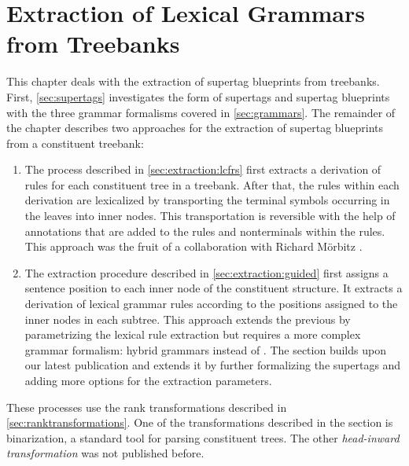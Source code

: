 \documentclass[../document.tex]{subfiles}
\begin{document}
    \chapter{Extraction of Lexical Grammars from Treebanks}\label{sec:extraction}
    This chapter deals with the extraction of supertag blueprints from treebanks.
    First, \cref{sec:supertags} investigates the form of supertags and supertag blueprints with the three grammar formalisms covered in \cref{sec:grammars}.
    The remainder of the chapter describes two approaches for the extraction of supertag blueprints from a constituent treebank:
    \begin{enumerate}
        \item
            The process described in \cref{sec:extraction:lcfrs} first extracts a derivation of  rules for each constituent tree in a treebank.
            After that, the rules within each derivation are lexicalized by transporting the terminal symbols occurring in the leaves into inner nodes.
            This transportation is reversible with the help of annotations that are added to the rules and nonterminals within the rules.
            This approach was the fruit of a collaboration with Richard Mörbitz \citep{MoeRup20,RupMoe21}.
        \item
            The extraction procedure described in \cref{sec:extraction:guided} first assigns a sentence position to each inner node of the constituent structure.
            It extracts a derivation of lexical grammar rules according to the positions assigned to the inner nodes in each subtree.
            This approach extends the previous by parametrizing the lexical rule extraction but requires a more complex grammar formalism: hybrid grammars instead of .
            The section builds upon our latest publication \citep{Rup22} and extends it by further formalizing the supertags and adding more options for the extraction parameters.
    \end{enumerate}
    These processes use the rank transformations described in \cref{sec:ranktransformations}.
    One of the transformations described in the section is binarization, a standard tool for parsing constituent trees.
    The other \emph{head-inward transformation} was not published before.

    
    
    
    

\end{document}
